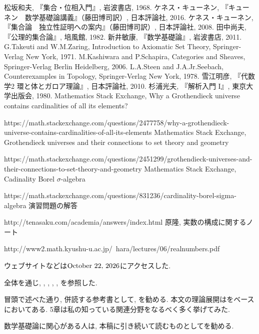 \documentclass[a4paper, twoside]{bxjsarticle}
\theoremstyle{definition}
\begin{document}
    \begin{thebibliography}{99}
         松坂和夫, 『集合・位相入門』, 岩波書店, 1968.
         ケネス・キューネン, 『キューネン　数学基礎論講義』（藤田博司訳）, 日本評論社, 2016.
         ケネス・キューネン, 『集合論　独立性証明への案内』（藤田博司訳）, 日本評論社, 2008.
         田中尚夫, 『公理的集合論』, 培風館, 1982.
         新井敏康, 『数学基礎論』, 岩波書店, 2011.
         G.Takeuti and W.M.Zaring, Introduction to Axiomatic Set Theory, Springer-Verlag New York, 1971.
         M.Kashiwara and P.Schapira, Categories and Sheaves, Springer-Verlag Berlin Heidelberg, 2006.
         L.A.Steen and J.A.Jr.Seebach, Counterexamples in Topology, Springer-Verlag New York, 1978.
         雪江明彦, 『代数学2 環と体とガロア理論』, 日本評論社, 2010.
         杉浦光夫, 『解析入門 I』, 東京大学出版会, 1980.
         Mathematics Stack Exchange, Why a Grothendieck universe contains cardinalities of all its elements? 
        
        https://math.stackexchange.com/questions/2477758/why-a-grothendieck-universe-contains-cardinalities-of-all-its-elements
         Mathematics Stack Exchange, Grothendieck universes and their connections to set theory and geometry
        
        https://math.stackexchange.com/questions/2451299/grothendieck-universes-and-their-connections-to-set-theory-and-geometry
         Mathematics Stack Exchange, Cadinality Borel $\sigma$-algebra
        
        https://math.stackexchange.com/questions/831236/cardinality-borel-sigma-algebra
         演習問題の解答
        
        http://tenasaku.com/academia/answers/index.html
         原隆, 実数の構成に関するノート
        
        http://www2.math.kyushu-u.ac.jp/~hara/lectures/06/realnumbers.pdf
        
    \end{thebibliography}
    ウェブサイトなどは$\mbox{\today}$にアクセスした.
    
    全体を通じ, \cite{kunenfound}, \cite{kunenset}, \cite{tanaka}, \cite{arai}, \cite{takeuti}を参照した. 
    
    冒頭で述べた通り, 併読する参考書として\cite{kunenfound}, \cite{kunenset}を勧める. 本文の理論展開は\cite{tanaka}をベースにおいてある. 5章は私の知っている関連分野をなるべく多く挙げてみた.
    
    数学基礎論に関心がある人は, 本稿に引き続いて読むものとして\cite{arai}を勧める. 
\end{document}
